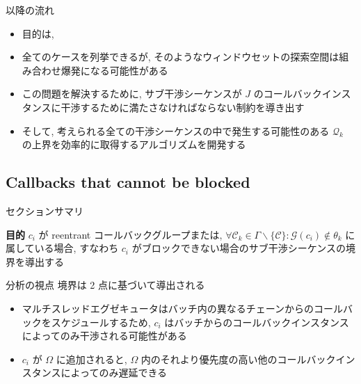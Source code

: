 \begin{frame}{以降の流れ}
    \begin{itemize}
        \item 目的は, \\ 
        \item 全てのケースを列挙できるが, そのようなウィンドウセットの探索空間は組み合わせ爆発になる可能性がある
        \item この問題を解決するために, サブ干渉シーケンスが $J$ のコールバックインスタンスに干渉するために満たさなければならない制約を導き出す
        \item そして, 考えられる全ての干渉シーケンスの中で発生する可能性のある $\mathcal{Q}_{k}$ の上界を効率的に取得するアルゴリズムを開発する
    \end{itemize}
\end{frame}


\subsection{Callbacks that cannot be blocked}
\label{ssec: callbacks_that_cannot_be_blocked}

\begin{frame}{セクションサマリ}
    \begin{itembox}[l]{\textbf{目的}}
        $c_{i}$ が reentrant コールバックグループまたは, $\forall \mathcal{C}_{k} \in \Gamma \backslash\{\mathcal{C}\}: \mathcal{G}\left(c_{i}\right) \notin \theta_{k}$ に属している場合, すなわち $c_{i}$ がブロックできない場合のサブ干渉シーケンスの境界を導出する
    \end{itembox}
\end{frame}

\begin{frame}{分析の視点}
    境界は 2 点に基づいて導出される
    \begin{itemize}
        \item マルチスレッドエグゼキュータはバッチ内の異なるチェーンからのコールバックをスケジュールするため, $c_{i}$ はバッチからのコールバックインスタンスによってのみ干渉される可能性がある
        \item $c_{i}$ が $\Omega$ に追加されると, $\Omega$ 内のそれより優先度の高い他のコールバックインスタンスによってのみ遅延できる
    \end{itemize}
\end{frame}

